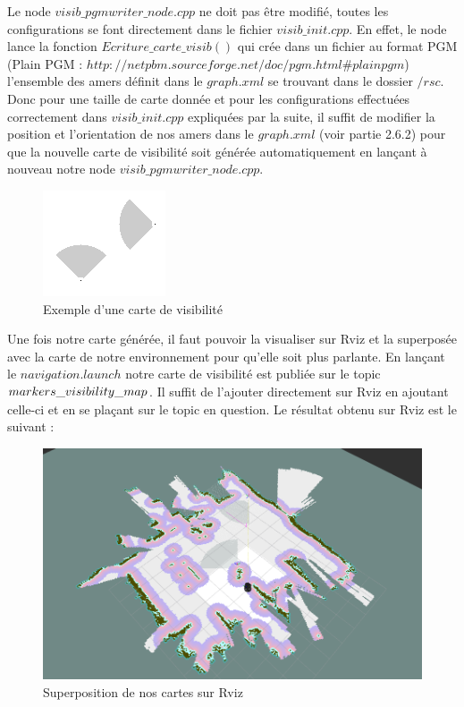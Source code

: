 \documentclass[10pt,a4paper]{article}
\begin{document}
Le node $visib\_pgmwriter\_node.cpp$ ne doit pas être modifié, toutes les configurations se font directement dans le fichier $visib\_init.cpp$. En effet, le node lance la fonction $Ecriture\_carte\_visib()$ qui crée dans un fichier au format PGM (Plain PGM : $http://netpbm.sourceforge.net/doc/pgm.html\#plainpgm$) l'ensemble des amers définit dans le $graph.xml$ se trouvant dans le dossier $/rsc$. Donc pour une taille de carte donnée et pour les configurations effectuées correctement dans $visib\_init.cpp$  expliquées par la suite, il suffit de modifier la position et l'orientation de nos amers dans le $graph.xml$ (voir partie 2.6.2) pour que la nouvelle carte de visibilité soit générée automatiquement en lançant à nouveau notre node $visib\_pgmwriter\_node.cpp$.\\

\begin{figure}[!h]
\center
\includegraphics{figures/visib.png} 
\caption{Exemple d'une carte de visibilité}	
\end{figure}

Une fois notre carte générée, il faut pouvoir la visualiser sur Rviz et la superposée avec la carte de notre environnement pour qu'elle soit plus parlante. En lançant le $navigation.launch$ notre carte de visibilité est publiée sur le topic $\/markers\_visibility\_map$. Il suffit de l'ajouter directement sur Rviz en ajoutant celle-ci et en se plaçant sur le topic en question. Le résultat obtenu sur Rviz est le suivant :

\begin{figure}[!h]
\center
\includegraphics[scale=0.4]{figures/visib_rviz.png} 
\caption{Superposition de nos cartes sur Rviz}	
\end{figure}
\end{document}
